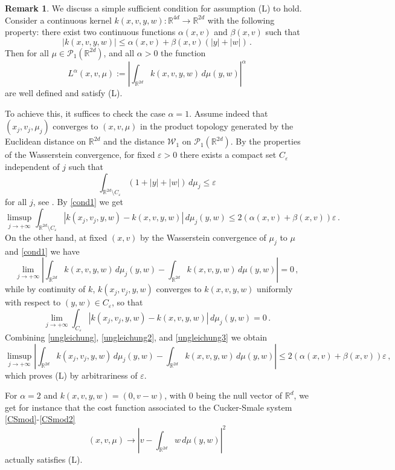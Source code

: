 \documentclass[11pt]{article}
\theoremstyle{plain}
\theoremstyle{definition}
\newtheorem{remark}[theorem]{Remark}
\theoremstyle{remark}
\numberwithin{equation}{section}
\newcommand{\R}{{\mathbb R}}
\newcommand{\e}{\varepsilon}
\begin{document}
\begin{remark}
We discuss a simple sufficient condition for assumption (L) to hold. Consider a continuous kernel $k(x,v,y,w)\colon \R^{4d}\to \R^{2d}$ with the following property: there exist two continuous functions $\alpha(x,v)$ and $\beta(x,v)$ such that
\begin{equation}\label{cond1}
|k(x,v, y, w)|\le \alpha(x,v)+ \beta (x,v) (|y|+|w|)\,.
\end{equation}
Then for all $\mu \in \mathcal P_1 (\mathbb R^{2d})$, and all $\alpha>0$ the function
$$
L^\alpha(x,v,\mu):=\left|\int_{\R^{2d}}k(x,v, y, w)\,d\mu(y,w)\right|^\alpha
$$
are well defined and satisfy (L).

To achieve this, it suffices to check the case $\alpha=1$. Assume indeed that $(x_j, v_j, \mu_j)$ converges to $(x,v,\mu)$ in the product topology generated by the Euclidean distance on $\R^{2d}$ and the distance $\mathcal W_1$ on $\mathcal P_1 (\mathbb R^{2d})$. By the properties of the Wasserstein convergence, for fixed $\e>0$ there exists a compact set $C_\e$ independent of $j$ such that
$$
\int_{\R^{2d}\setminus C_\e}(1+|y|+|w|)\,d\mu_j\le \e
$$
for all $j$, see \cite[Proposition 7.5.1]{AGS}. By \eqref{cond1} we get
\begin{equation}\label{ungleichung}
\limsup_{j\to +\infty}\int_{\R^{2d}\setminus C_\e}|k(x_j,v_j, y, w)-k(x,v, y, w)|\,d\mu_j(y,w)\le 2(\alpha(x,v)+\beta(x,v))\e\,.
\end{equation}
On the other hand, at fixed $(x,v)$ by the Wasserstein convergence of $\mu_j$ to $\mu$ and \eqref{cond1} we have
\begin{equation}\label{ungleichung2}
\lim_{j\to +\infty}\left|\int_{\R^{2d}}k(x,v, y, w)\,d\mu_j(y,w)- \int_{\R^{2d}}k(x,v, y, w)\,d\mu(y,w)\right|=0\,,
\end{equation}
while by continuity of $k$, $k(x_j, v_j, y, w)$ converges to $k(x,v,y,w)$ uniformly with respect to $(y,w)\in C_\e$, so that
\begin{equation}\label{ungleichung3}
\lim_{j\to +\infty}\int_{C_\e}|k(x_j,v_j, y, w)-k(x,v, y, w)|\,d\mu_j(y,w)=0\,.
\end{equation}
Combining \eqref{ungleichung}, \eqref{ungleichung2}, and \eqref{ungleichung3} we obtain
$$
\limsup_{j\to +\infty}\left|\int_{\R^{2d}}k(x_j,v_j, y, w)\,d\mu_j(y,w)- \int_{\R^{2d}}k(x,v, y, w)\,d\mu(y,w)\right|\le 2(\alpha(x,v)+\beta(x,v))\e\,,
$$
which proves (L) by arbitrariness of $\e$.

For $\alpha=2$ and $k(x,v,y,w)=(0,v-w)$, with $0$ being the null vector of $\R^d$, we get for instance that the cost function associated to the Cucker-Smale system \eqref{CSmod}-\eqref{CSmod2}
$$
(x,v,\mu)\to \left|v-\int_{\R^{2d}}w\,d\mu(y,w)\right|^2
$$
actually satisfies (L).
\end{remark}
\end{document}
